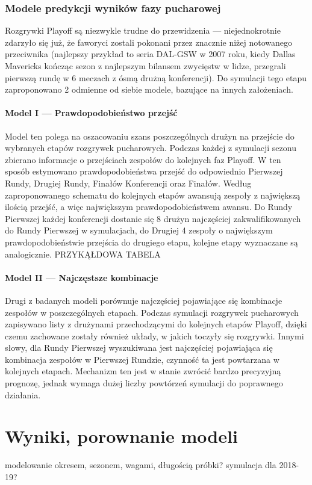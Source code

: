 \documentclass[inzynierska]{pwr_wmat_praca_dyplomowa}
\theoremstyle{plain}
\numberwithin{theorem}{chapter}
\theoremstyle{definition}
\numberwithin{theorem}{chapter}
\begin{document}
\subsection{Modele predykcji wyników fazy pucharowej}
Rozgrywki Playoff są niezwykle trudne do przewidzenia --- niejednokrotnie zdarzyło się już, że faworyci zostali pokonani przez znacznie niżej notowanego przeciwnika (najlepszy przykład to seria DAL-GSW w 2007 roku, kiedy Dallas Mavericks kończąc sezon z najlepszym bilansem zwycięstw w lidze, przegrali pierwszą rundę w 6 meczach z ósmą drużną konferencji).
Do symulacji tego etapu zaproponowano 2 odmienne od siebie modele, bazujące na innych założeniach.

\subsubsection{Model I --- Prawdopodobieństwo przejść}
Model ten polega na oszacowaniu szans poszczególnych drużyn na przejście do wybranych etapów rozgrywek pucharowych. Podczas każdej z symulacji sezonu zbierano informacje o przejściach zespołów do kolejnych faz Playoff. W ten sposób estymowano prawdopodobieństwa przejść do odpowiednio Pierwszej Rundy, Drugiej Rundy, Finałów Konferencji oraz Finałów. Według zaproponowanego schematu do kolejnych etapów awansują zespoły z największą ilością przejść, a więc największym prawdopodobieństwem awansu. Do Rundy Pierwszej każdej konferencji dostanie się 8 drużyn najczęściej zakwalifikowanych do Rundy Pierwszej w symulacjach, do Drugiej 4 zespoły o największym prawdopodobieństwie przejścia do drugiego etapu, kolejne etapy wyznaczane są analogicznie.  
PRZYKĄŁDOWA TABELA

\subsubsection{Model II --- Najczęstsze kombinacje}
Drugi z badanych modeli porównuje najczęściej pojawiające się kombinacje zespołów w poszczególnych etapach. Podczas symulacji rozgrywek pucharowych zapisywano listy z drużynami przechodzącymi do kolejnych etapów Playoff, dzięki czemu zachowane zostały również układy, w jakich toczyły się rozgrywki. Innymi słowy, dla Rundy Pierwszej wyszukiwana jest najczęściej pojawiająca się kombinacja zespołów w Pierwszej Rundzie, czynność ta jest powtarzana w kolejnych etapach. Mechanizm ten jest w stanie zwrócić bardzo precyzyjną prognozę, jednak wymaga dużej liczby powtórzeń symulacji do poprawnego działania. 

\chapter{Wyniki, porownanie modeli}
modelowanie okresem, sezonem, wagami, długością próbki?
symulacja dla 2018-19?
\end{document}
